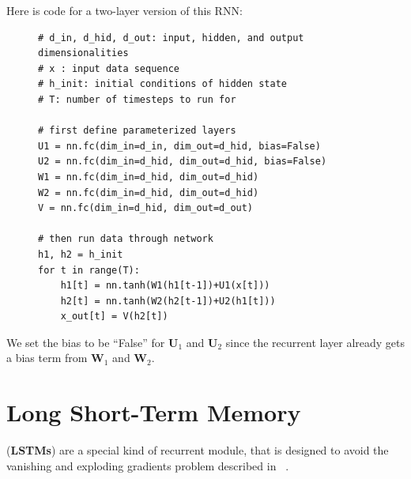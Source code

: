 Here is code for a two-layer version of this RNN:
\begin{figure}[h]
\begin{minipage}{1.0\linewidth}
\begin{verbatim}
# d_in, d_hid, d_out: input, hidden, and output dimensionalities
# x : input data sequence
# h_init: initial conditions of hidden state
# T: number of timesteps to run for

# first define parameterized layers
U1 = nn.fc(dim_in=d_in, dim_out=d_hid, bias=False)
U2 = nn.fc(dim_in=d_hid, dim_out=d_hid, bias=False)
W1 = nn.fc(dim_in=d_hid, dim_out=d_hid)
W2 = nn.fc(dim_in=d_hid, dim_out=d_hid)
V = nn.fc(dim_in=d_hid, dim_out=d_out)

# then run data through network
h1, h2 = h_init
for t in range(T):
    h1[t] = nn.tanh(W1(h1[t-1])+U1(x[t]))
    h2[t] = nn.tanh(W2(h2[t-1])+U2(h1[t]))
    x_out[t] = V(h2[t])
\end{verbatim}
\end{minipage}
\end{figure}

We set the bias to be ``False'' for $\mathbf{U}_1$ and $\mathbf{U}_2$ since the recurrent layer already gets a bias term from $\mathbf{W}_1$ and $\mathbf{W}_2$.





\section{Long Short-Term Memory}\label{sec:recurrent_neural_networks:LSTMS}
 ({\bf LSTMs}) are a special kind of recurrent module, that is designed to avoid the vanishing and exploding gradients problem described in \sect{\ref{sec:recurrent_neural_networks:bptt}} ~\cite{hochreiter1997long}.

